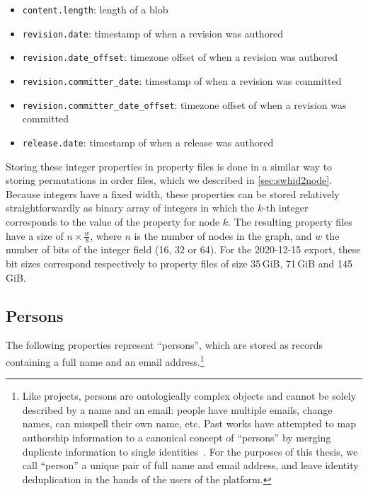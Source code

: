 \begin{itemize}
    \setlength\itemsep{0em}
    \item \texttt{content.length}: length of a blob
    \item \texttt{revision.date}: timestamp of when a revision was authored
    \item \texttt{revision.date\_offset}: timezone offset of when a revision
        was authored
    \item \texttt{revision.committer\_date}: timestamp of when a revision was
        committed
    \item \texttt{revision.committer\_date\_offset}: timezone offset of when a
        revision was committed
    \item \texttt{release.date}: timestamp of when a release was authored
\end{itemize}

Storing these integer properties in property files is done in a similar way
to storing permutations in order files, which we described in
\cref{sec:swhid2node}. Because integers have a fixed width, these properties
can be stored relatively straightforwardly as binary array of integers in which
the $k$-th integer corresponds to the value of the property for node $k$.  The
resulting property files have a size of {\Large $n \times \frac{w}{8}$}, where
$n$ is the number of nodes in the graph, and $w$ the number of bits of the
integer field (16, 32 or 64). For the 2020-12-15 export, these bit sizes
correspond respectively to property files of size 35\,GiB, 71\,GiB and
145\,GiB.

\subsection{Persons}%
\label{sec:mapping-persons}

The following properties represent ``persons'', which are stored as records
containing a full name and an email address.\footnote{Like projects, persons
are ontologically complex objects and cannot be solely described by a name and
an email: people have multiple emails, change names, can misspell their own
name, etc. Past works have attempted to map authorship information to a
canonical concept of ``persons'' by merging duplicate information to single
identities~\cite{wiese2016mailing, zhu2019empirical}. For the purposes of this
thesis, we call ``person'' a unique pair of full name and email address, and
leave identity deduplication in the hands of the users of the platform.}

